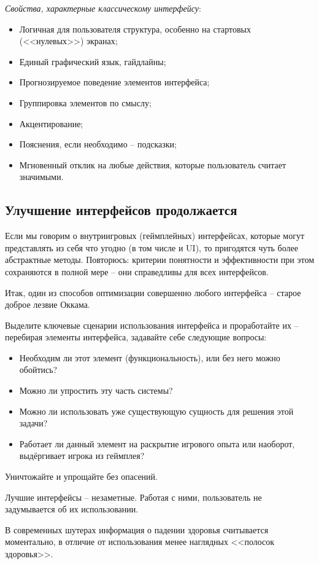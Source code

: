 \documentclass{article}
\begin{document}
\textit{Свойства, характерные классическому интерфейсу}:
\begin{itemize}
  \item Логичная для пользователя структура, особенно на стартовых (<<нулевых>>) экранах;
  \item Единый графический язык, гайдлайны;
  \item Прогнозируемое поведение элементов интерфейса;
  \item Группировка элементов по смыслу;
  \item Акцентирование;
  \item Пояснения, если необходимо -- подсказки;
  \item Мгновенный отклик на любые действия, которые пользователь считает значимыми.
\end{itemize}

\subsection{Улучшение интерфейсов продолжается}
Если мы говорим о внутриигровых (геймплейных) интерфейсах, которые могут представлять из себя что угодно (в том числе и UI), то пригодятся чуть более абстрактные методы. Повторюсь: критерии понятности и эффективности при этом сохраняются в полной мере -- они справедливы для всех интерфейсов.

Итак, один из способов оптимизации совершенно любого интерфейса -- старое доброе лезвие Оккама.

Выделите ключевые сценарии использования интерфейса и проработайте их -- перебирая элементы интерфейса, задавайте себе следующие вопросы:
\begin{itemize}
  \item Необходим ли этот элемент (функциональность), или без него можно обойтись?
  \item Можно ли упростить эту часть системы?
  \item Можно ли использовать уже существующую сущность для решения этой задачи?
  \item Работает ли данный элемент на раскрытие игрового опыта или наоборот, выдёргивает игрока из геймплея?
\end{itemize}

Уничтожайте и упрощайте без опасений.

Лучшие интерфейсы -- незаметные. Работая с ними, пользователь не задумывается об их использовании.

В современных шутерах информация о падении здоровья считывается моментально, в отличие от использования менее наглядных <<полосок здоровья>>.
\end{document}
